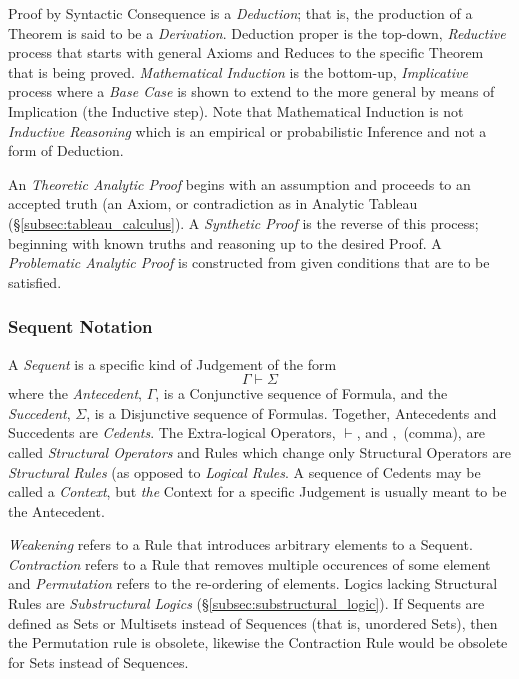 \documentclass{article}
\begin{document}
Proof by Syntactic Consequence is a \emph{Deduction}; that is, the
production of a Theorem is said to be a \emph{Derivation}. Deduction
proper is the top-down, \emph{Reductive} process that starts with
general Axioms and Reduces to the specific Theorem that is being
proved. \emph{Mathematical Induction} is the bottom-up,
\emph{Implicative} process where a \emph{Base Case} is shown to extend
to the more general by means of Implication (the Inductive step). Note
that Mathematical Induction is not \emph{Inductive Reasoning} which is
an empirical or probabilistic Inference and not a form of Deduction.

An \emph{Theoretic Analytic Proof} begins with an assumption and
proceeds to an accepted truth (an Axiom, or contradiction as in
Analytic Tableau (\S\ref{subsec:tableau_calculus}). A \emph{Synthetic
  Proof} is the reverse of this process; beginning with known truths
and reasoning up to the desired Proof. A \emph{Problematic Analytic
  Proof} is constructed from given conditions that are to be
satisfied.

\subsubsection{Sequent Notation}\label{subsec:sequent_notation}

A \emph{Sequent} is a specific kind of Judgement of the form
\[\Gamma \vdash \Sigma \]
where the \emph{Antecedent}, $\Gamma$, is a Conjunctive sequence of
Formula, and the \emph{Succedent}, $\Sigma$, is a Disjunctive sequence
of Formulas. Together, Antecedents and Succedents are
\emph{Cedents}. The Extra-logical Operators, $\vdash$, and $,$
(comma), are called \emph{Structural Operators} and Rules which change
only Structural Operators are \emph{Structural Rules} (as opposed to
\emph{Logical Rules}. A sequence of Cedents may be called a
\emph{Context}, but \emph{the} Context for a specific Judgement is
usually meant to be the Antecedent.

\emph{Weakening} refers to a Rule that introduces arbitrary elements
to a Sequent. \emph{Contraction} refers to a Rule that removes
multiple occurences of some element and \emph{Permutation} refers to
the re-ordering of elements. Logics lacking Structural Rules are
\emph{Substructural Logics} (\S\ref{subsec:substructural_logic}). If
Sequents are defined as Sets or Multisets instead of Sequences (that
is, unordered Sets), then the Permutation rule is obsolete, likewise
the Contraction Rule would be obsolete for Sets instead of Sequences.
\end{document}
